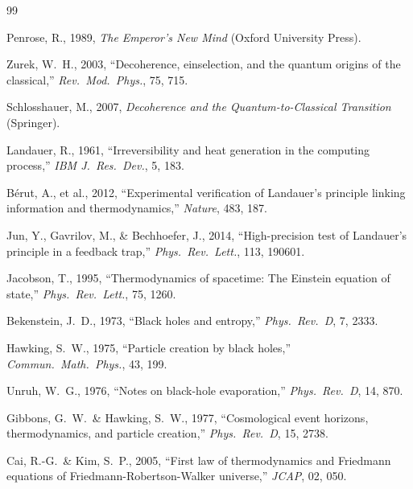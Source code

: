\documentclass[11pt]{article}
\begin{document}

\begin{thebibliography}{99}

Penrose, R., 1989, \textit{The Emperor's New Mind} (Oxford University Press).

Zurek, W.~H., 2003, ``Decoherence, einselection, and the quantum origins
of the classical,'' \textit{Rev.\ Mod.\ Phys.}, 75, 715.

Schlosshauer, M., 2007, \textit{Decoherence and the Quantum-to-Classical
Transition} (Springer).

Landauer, R., 1961, ``Irreversibility and heat generation in the computing
process,'' \textit{IBM J.\ Res.\ Dev.}, 5, 183.

B\'{e}rut, A., et al., 2012, ``Experimental verification of Landauer's
principle linking information and thermodynamics,'' \textit{Nature}, 483, 187.

Jun, Y., Gavrilov, M., \& Bechhoefer, J., 2014, ``High-precision test of
Landauer's principle in a feedback trap,'' \textit{Phys.\ Rev.\ Lett.},
113, 190601.

Jacobson, T., 1995, ``Thermodynamics of spacetime: The Einstein equation
of state,'' \textit{Phys.\ Rev.\ Lett.}, 75, 1260.

Bekenstein, J.~D., 1973, ``Black holes and entropy,'' \textit{Phys.\ Rev.\
D}, 7, 2333.

Hawking, S.~W., 1975, ``Particle creation by black holes,''
\textit{Commun.\ Math.\ Phys.}, 43, 199.

Unruh, W.~G., 1976, ``Notes on black-hole evaporation,'' \textit{Phys.\
Rev.\ D}, 14, 870.

Gibbons, G.~W.\ \& Hawking, S.~W., 1977, ``Cosmological event horizons,
thermodynamics, and particle creation,'' \textit{Phys.\ Rev.\ D}, 15, 2738.

\bibitem[{Cai \& Kim}(2005)]{CaiKim2005}
Cai, R.-G.\ \& Kim, S.~P., 2005, ``First law of thermodynamics and
Friedmann equations of Friedmann-Robertson-Walker universe,'' \textit{JCAP},
02, 050.


\end{thebibliography}
\end{document}
